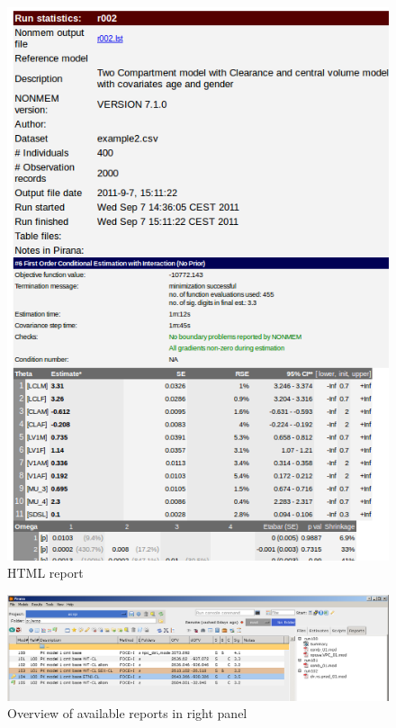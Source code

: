 \begin{figure}[h] \centering
    \includegraphics[scale=.4]{images/report_5.png}
    \caption{HTML report\label{fig:Fig4}}
\end{figure}

\begin{figure}[h] \centering
    \includegraphics[scale=.25]{images/report_3.png}
    \caption{Overview of available reports in right panel\label{fig:Fig5}}
\end{figure}

